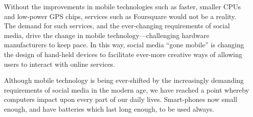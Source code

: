 \documentclass[a4paper,11pt]{article}
\begin{document}
    Without the improvements in mobile technologies such as faster, smaller
    CPUs and low-power GPS chips, services such as Foursquare would not be
    a reality. The demand for such services, and the ever-changing requirements
    of social media, drive the change in mobile technology---challenging
    hardware manufacturers to keep pace. In this way, social media ``gone
    mobile'' is changing the design of hand-held devices to facilitate
    ever-more creative ways of allowing users to interact with online services.

    Although mobile technology is being ever-shifted by the increasingly
    demanding requirements of social media in the modern age, we have reached
    a point whereby computers impact upon every part of our daily lives.
    Smart-phones now small enough, and have batteries which last long enough,
    to be used always.

    
    
\end{document}
